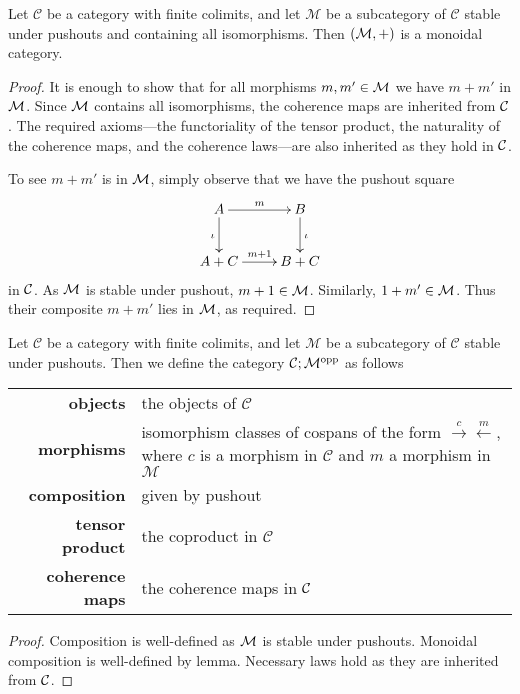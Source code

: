 \begin{lemma}
  Let $\mathcal C$ be a category with finite colimits, and let $\mathcal M$ be a
  subcategory of $\mathcal C$ stable under pushouts and containing all
  isomorphisms. Then $(\mathcal M,+)$ is a monoidal category.
\end{lemma}
\begin{proof}
  It is enough to show that for all morphisms $m,m' \in \mathcal M$ we have $m+m'$ in
  $\mathcal M$. Since $\mathcal M$ contains all isomorphisms, the coherence maps are
  inherited from $\mathcal C$. The required axioms---the functoriality of the tensor
  product, the naturality of the coherence maps, and the coherence laws---are
  also inherited as they hold in $\mathcal C$.

  To see $m+m'$ is in $\mathcal M$, simply observe that we have the pushout square
  \[
    \xymatrix{
      A \ar[r]^m \ar[d]_{\iota} & B \ar[d]^{\iota} \\
      A+C \ar[r]^{m+1} & B+C
    }
  \]
  in $\mathcal C$. As $\mathcal M$ is stable under pushout, $m+1 \in \mathcal M$. Similarly,
  $1+m' \in \mathcal M$. Thus their composite $m+m'$ lies in $\mathcal M$, as required.
\end{proof}

\begin{proposition}
  Let $\mathcal C$ be a category with finite colimits, and let $\mathcal M$ be a
  subcategory of $\mathcal C$ stable under pushouts. Then we define the category
  $\mathcal C; \mathcal M^{\mathrm{opp}}$ as follows  
  
  \begin{tabular}{ r p{}}
    \textbf{objects} & the objects of $\mathcal C$ \\ 
    \textbf{morphisms} & isomorphism classes of cospans of the form $\stackrel{c}\rightarrow
  \stackrel{m}\leftarrow$, where $c$ is a morphism in $\mathcal C$ and $m$ a
  morphism in $\mathcal M$\\ 
  \textbf{composition} & given by pushout \\
  \textbf{tensor product} & the coproduct in $\mathcal C$ \\
  \textbf{coherence maps} & the coherence maps in $\mathcal C$
  \end{tabular}
\end{proposition}
\begin{proof}
  Composition is well-defined as $\mathcal M$ is stable under pushouts. Monoidal
  composition is well-defined by lemma. Necessary laws hold as they are
  inherited from $\mathcal C$. 
\end{proof}

